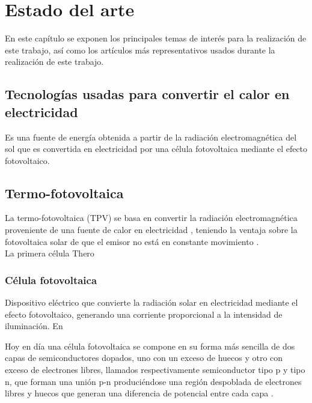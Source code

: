 \chapter{Estado del arte}


En este capítulo se exponen los principales temas de interés para la realización de este trabajo, así como los artículos más representativos usados durante la realización de este trabajo.
\section{Tecnologías usadas para convertir el calor en electricidad}
Es una fuente de energía obtenida a partir de la radiación electromagnética del sol que es convertida en electricidad por una célula fotovoltaica mediante el efecto fotovoltaico.




\section{Termo-fotovoltaica}
La termo-fotovoltaica (TPV) se basa en convertir la radiación electromagnética proveniente de una fuente de calor en electricidad \cite{ThermophotovolticEnergyConversion_DATAS2021285}, teniendo la ventaja sobre la fotovoltaica solar de que el emisor no está en constante movimiento \cite{ThermophotovolticEnergyConversion_DATAS2021285}.\\

La primera célula Thero
\subsection{Célula fotovoltaica}
Dispositivo eléctrico que convierte la radiación solar en electricidad mediante el efecto fotovoltaico, generando una corriente proporcional a la intensidad de iluminación. En 

Hoy en día una célula fotovoltaica se compone en su forma más sencilla de dos capas de semiconductores dopados, uno con un exceso de huecos y otro con exceso de electrones libres, llamados respectivamente semiconductor tipo p y tipo n, que forman una unión p-n produciéndose una región despoblada de electrones libres y huecos que generan una diferencia de potencial entre cada capa \cite{PhotovoltaicCell_FullDescription_EstadoDelArte_KHALIGH2018725}.\\

